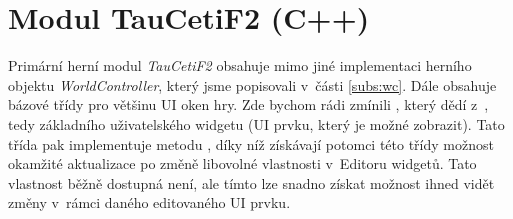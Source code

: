 
\section{Modul TauCetiF2 (C++)}
Primární herní modul \textit{TauCetiF2} obsahuje mimo jiné implementaci herního objektu \textit{WorldController}, který jsme popisovali v~části \ref{subs:wc}. Dále obsahuje bázové třídy pro většinu UI oken hry. Zde bychom rádi zmínili , který dědí z~, tedy základního uživatelského widgetu (UI prvku, který je možné zobrazit). Tato třída pak implementuje metodu , díky níž získávají potomci této třídy možnost okamžité aktualizace po změně libovolné vlastnosti v~Editoru widgetů. Tato vlastnost běžně dostupná není, ale tímto  lze snadno získat možnost ihned vidět změny v~rámci daného editovaného UI prvku.
 